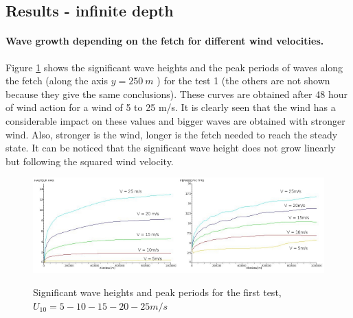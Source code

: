 \subsection{Results - infinite depth }
\paragraph{Wave growth depending on the fetch for different wind velocities.}
Figure \ref{hsfet} shows the significant wave heights and the peak periods of waves along the fetch (along the axis $ y = 250~m$ ) for the test 1 (the others are not shown because they give the same conclusions). These curves are obtained after 48 hour of wind action for a wind of 5 to 25 m/s. It is clearly seen that the wind has a considerable impact on these values and bigger waves are obtained with stronger wind. Also, stronger is the wind, longer is the fetch needed to reach the steady state. It can be noticed that the significant wave height does not grow linearly but following the squared wind velocity.
\begin{figure}[H]
  \centering
  	\includegraphics[width=0.5\textwidth]{Hm0_free_mesh.jpg}\includegraphics[width=0.5\textwidth]{Tp_free_mesh.jpg}
      \caption{Significant wave heights and peak periods for the first test, $U_{10} = 5 - 10 - 15 - 20 - 25 m/s$}
\label{hsfet}
\end{figure}

